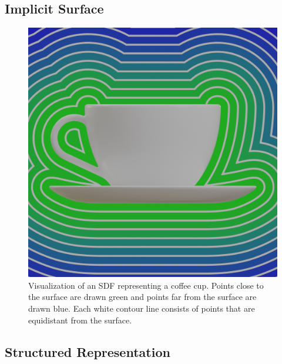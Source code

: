 \subsection{Implicit Surface}
\label{subsec:implicit_surface}

\begin{figure}[h]
	\centering
	\includegraphics[scale=0.2]{Images/SDF Cup}
	\caption{Visualization of an SDF representing a coffee cup. Points close to the surface are drawn green and points far from the surface are drawn blue. Each white contour line consists of points that are equidistant from the surface.}
	\label{fig:sdf_cup}
\end{figure}

\subsection{Structured Representation}
\label{subsec:structured_representation}

